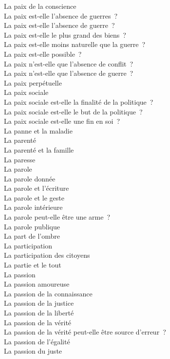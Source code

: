 \documentclass[a4paper,12pt]{article}
\begin{document}
La paix de la conscience \\
La paix est-elle l'absence de guerres ? \\
La paix est-elle l'absence de guerre ? \\
La paix est-elle le plus grand des biens ? \\
La paix est-elle moins naturelle que la guerre ? \\
La paix est-elle possible ? \\
La paix n'est-elle que l'absence de conflit ? \\
La paix n'est-elle que l'absence de guerre ? \\
La paix perpétuelle \\
La paix sociale \\
La paix sociale est-elle la finalité de la politique ? \\
La paix sociale est-elle le but de la politique ? \\
La paix sociale est-elle une fin en soi ? \\
La panne et la maladie \\
La parenté \\
La parenté et la famille \\
La paresse \\
La parole \\
La parole donnée \\
La parole et l'écriture \\
La parole et le geste \\
La parole intérieure \\
La parole peut-elle être une arme ? \\
La parole publique \\
La part de l'ombre \\
La participation \\
La participation des citoyens \\
La partie et le tout \\
La passion \\
La passion amoureuse \\
La passion de la connaissance \\
La passion de la justice \\
La passion de la liberté \\
La passion de la vérité \\
La passion de la vérité peut-elle être source d'erreur ? \\
La passion de l'égalité \\
La passion du juste \\
\end{document}
